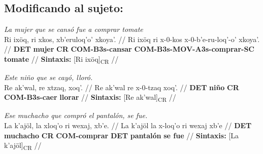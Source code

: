 \documentclass{article}%
\begin{document}
\subsection{Modificando al sujeto:}%
\label{subsec:Modificandoalsujeto}%

%
\par\medskip%
\ex
\textit{La mujer que se cansó fue a comprar tomate} \\
\begingl
\gla Ri ixöq, ri xkos, xb'eruloq'o' xkoya'. //
\glb Ri ixöq ri x-0-kos x-0-b'e-ru-loq'-o' xkoya'. //
\glc \textbf{DET} \textbf{mujer} \textbf{CR} \textbf{COM-}\textbf{B3s-}\textbf{cansar} \textbf{COM-}\textbf{B3s-}\textbf{MOV-A3s-comprar-SC} \textbf{tomate} //
\glft \textbf{Sintaxis:} [Ri ixöq]\textsubscript{CR} //
\endgl
\xe
%
\medskip%
\par\medskip%
\ex
\textit{Este niño que se cayó, lloró.} \\
\begingl
\gla Re ak'wal, re xtzaq, xoq'. //
\glb Re ak'wal re x-0-tzaq xoq'. //
\glc \textbf{DET} \textbf{niño} \textbf{CR} \textbf{COM-}\textbf{B3s-}\textbf{caer} \textbf{llorar} //
\glft \textbf{Sintaxis:} [Re ak'wal]\textsubscript{CR} //
\endgl
\xe
%
\medskip%
\par\medskip%
\ex
\textit{Ese muchacho que compró el pantalón, se fue.} \\
\begingl
\gla La k'ajöl, la xloq'o ri wexaj, xb'e. //
\glb La k'ajöl la x-loq'o ri wexaj xb'e //
\glc \textbf{DET} \textbf{muchacho} \textbf{CR} \textbf{COM-}\textbf{comprar} \textbf{DET} \textbf{pantalón} \textbf{se fue} //
\glft \textbf{Sintaxis:} [La k'ajöl]\textsubscript{CR} //
\endgl
\xe
%
\medskip

%
\end{document}
